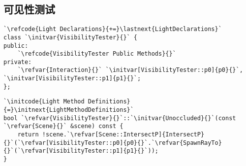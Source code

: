 \subsection{可见性测试}\label{sub:可见性测试}
\begin{lstlisting}
`\refcode{Light Declarations}{+=}\lastnext{LightDeclarations}`
class `\initvar{VisibilityTester}{}` {
public:
    `\refcode{VisibilityTester Public Methods}{}`
private:
    `\refvar{Interaction}{}` `\initvar[VisibilityTester::p0]{p0}{}`, `\initvar[VisibilityTester::p1]{p1}{}`;
};
\end{lstlisting}
\begin{lstlisting}
`\initcode{Light Method Definitions}{=}\initnext{LightMethodDefinitions}`
bool `\refvar{VisibilityTester}{}`::`\initvar{Unoccluded}{}`(const `\refvar{Scene}{}` &scene) const {
    return !scene.`\refvar[Scene::IntersectP]{IntersectP}{}`(`\refvar[VisibilityTester::p0]{p0}{}`.`\refvar{SpawnRayTo}{}`(`\refvar[VisibilityTester::p1]{p1}{}`));
}
\end{lstlisting}